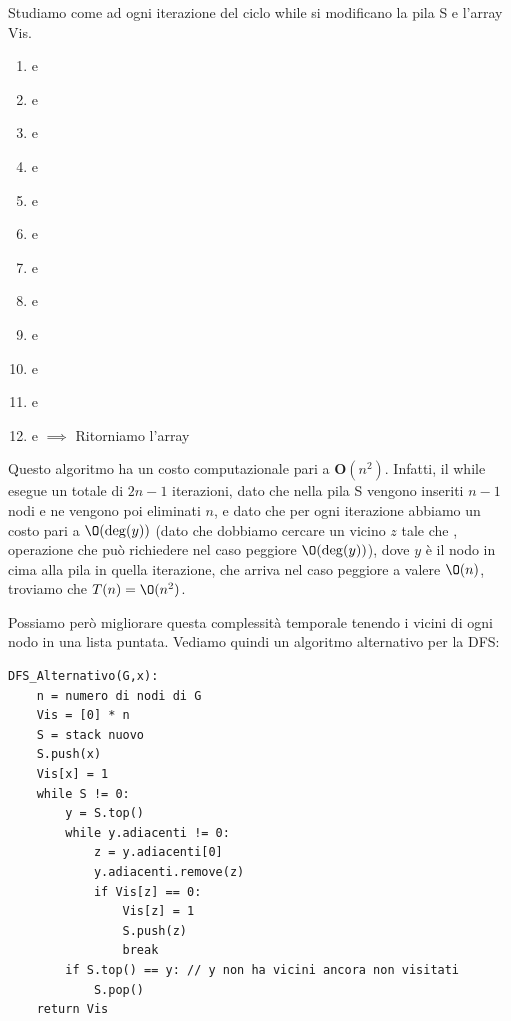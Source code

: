 \documentclass[11pt, a4paper, titlepage, oneside]{scrbook}
\begin{document}
Studiamo come ad ogni iterazione del ciclo while si modificano la pila S e l'array Vis.
\begin{enumerate}[label=\arabic*°]
    \item {} e 
    \item {} e 
    \item {} e 
    \item {} e 
    \item {} e 
    \item {} e 
    \item {} e     
    \item {} e 
    \item {} e 
    \item {} e 
    \item {} e 
    \item {} e  $\implies$ Ritorniamo l'array 
\end{enumerate}

Questo algoritmo ha un costo computazionale pari a $\textbf{O}(n^2)$. Infatti, il while esegue un totale di $2n-1$ iterazioni, dato che nella pila S vengono inseriti $n-1$ nodi e ne vengono poi eliminati $n$, e dato che per ogni iterazione abbiamo un costo pari a $\O(\deg(y))$ (dato che dobbiamo cercare un vicino $z$ tale che , operazione che può richiedere nel caso peggiore $\O(\deg(y))$), dove $y$ è il nodo in cima alla pila in quella iterazione, che arriva nel caso peggiore a valere $\O(n)$, troviamo che $T(n) = \O(n^2)$. 

Possiamo però migliorare questa complessità temporale tenendo i vicini di ogni nodo in una lista puntata. Vediamo quindi un algoritmo alternativo per la DFS:

\begin{lstlisting}[style=Python]
DFS_Alternativo(G,x):
    n = numero di nodi di G
    Vis = [0] * n
    S = stack nuovo
    S.push(x)
    Vis[x] = 1
    while S != 0:
        y = S.top()
        while y.adiacenti != 0:
            z = y.adiacenti[0]
            y.adiacenti.remove(z)
            if Vis[z] == 0:
                Vis[z] = 1
                S.push(z)
                break
        if S.top() == y: // y non ha vicini ancora non visitati
            S.pop()
    return Vis 
\end{lstlisting}
\end{document}

